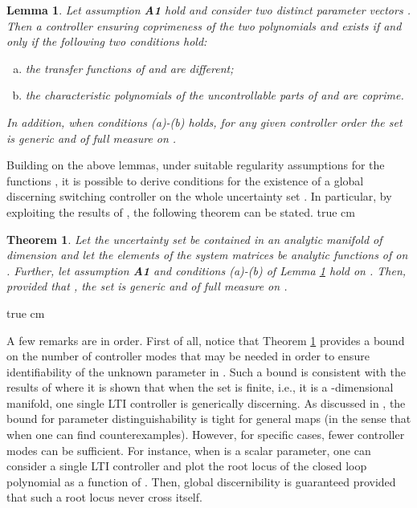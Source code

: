 \documentclass[letterpaper, 10 pt, conference]{ieeetran}
\def\qedp{\hspace*{\fill}~{\tiny }}
\def\salt{\vskip 0.2 true cm}
\newtheorem{theorem}{Theorem}
\newtheorem{itlemma}{Lemma}
\newenvironment{lemma}{\begin{itlemma}\rm}{\end{itlemma}}
\begin{document}
\begin{lemma} \label{lem:autp}
\cite{Ba13} Let assumption \textbf{A1} hold and consider two distinct parameter vectors . Then a  controller  ensuring 
coprimeness of the two polynomials  and  exists if and only if 
the following two conditions hold:
\begin{enumerate}[(a)]
\item the transfer functions of  and 
are different;
\item the characteristic polynomials of the uncontrollable parts of  and  are coprime.
\end{enumerate}
In addition, when conditions (a)-(b) holds, for any given controller order  the set  is generic and of full measure on . 
\qedp
\end{lemma}  

Building on the above lemmas, under suitable regularity assumptions for the functions , it is possible to derive conditions for the existence of a global
discerning switching controller on the whole uncertainty set . In particular,  by exploiting the results of \cite{Sontag}, the following theorem can be stated. \salt

\begin{theorem} \label{thm1}
Let the uncertainty set  be contained in an analytic manifold  of dimension  and let the elements of the system matrices 
 be analytic functions of  on . Further, let assumption \textbf{A1} and conditions (a)-(b) of Lemma \ref{lem:autp} hold on .
Then, provided that , the set  is generic and of full measure on .
\qedp
\end{theorem} \salt

A few remarks are in order. First of all, notice that Theorem \ref{thm1} provides a bound on the number  of controller modes
that may be needed in order to ensure identifiability of the unknown parameter  in . Such a bound is consistent with the results of \cite{Ba13,BaBaTe14} where it is shown
that when the set  is finite, i.e., it is a -dimensional manifold, one single LTI controller is generically discerning. As discussed in  \cite{Sontag}, the bound
 for parameter distinguishability is tight for general maps (in the sense that when  one can find counterexamples). However,
for specific cases, fewer controller modes can be sufficient. For instance, when  is a scalar parameter, one can consider a single LTI controller  
and plot the root locus of the closed loop polynomial  as a function of . Then, global discernibility is guaranteed provided that such a root locus never cross itself.
\end{document}
